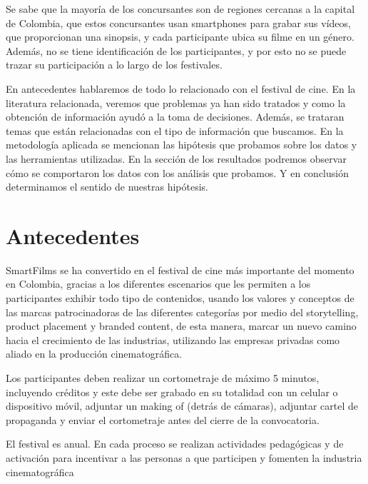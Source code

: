 \documentclass[5p,times]{elsarticle}
\begin{document}
Se sabe que la mayoría de los concursantes son de regiones cercanas a la capital de Colombia, que estos concursantes usan smartphones para grabar sus vídeos, que proporcionan una sinopsis, y cada participante ubica su filme en un género. Además, no se tiene identificación de los participantes, y por esto no se puede trazar su participación a lo largo de los festivales.

En antecedentes hablaremos de todo lo relacionado con el festival de cine. En la literatura relacionada, veremos que problemas ya han sido tratados y como la obtención de información ayudó a la toma de decisiones. Además, se trataran temas que están relacionadas con el tipo de información que buscamos. En la metodología aplicada se mencionan las hipótesis que probamos sobre los datos y las herramientas utilizadas. En la sección de los resultados podremos observar cómo se comportaron los datos con los análisis que probamos. Y en conclusión determinamos el sentido de nuestras hipótesis.

\section*{Antecedentes}
SmartFilms se ha convertido en el festival de cine más importante del momento en Colombia, gracias a los diferentes escenarios que les permiten a los participantes exhibir todo tipo de contenidos, usando los valores y conceptos de las marcas patrocinadoras de las diferentes categorías por medio del storytelling, product placement y branded content, de esta manera, marcar un nuevo camino hacia el crecimiento de las industrias, utilizando las empresas privadas como aliado en la producción cinematográfica.

Los participantes deben realizar un cortometraje de máximo 5 minutos, incluyendo créditos y este debe ser grabado en su totalidad con un celular o dispositivo móvil, adjuntar un making of (detrás de cámaras), adjuntar cartel de propaganda y enviar el cortometraje antes del cierre de la convocatoria.

El festival es anual. En cada proceso se realizan actividades pedagógicas y de activación para incentivar a las personas a que participen y fomenten la industria cinematográfica
\end{document}
